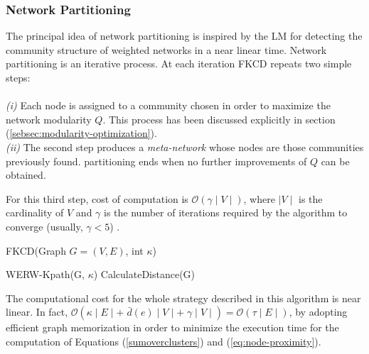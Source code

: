 {\subsubsection*{Network Partitioning}\label{subsec:network-partitioning}
The principal idea of network partitioning is inspired by the LM \cite{ref-27} for detecting the community structure of weighted networks in a near linear time. Network partitioning is an iterative process. At each iteration FKCD repeats two simple steps:\\\\
\textit{(i)} Each node is assigned to a community chosen in order to maximize the network modularity $Q$. This process has been discussed explicitly in section (\ref{sebsec:modularity-optimization}).\\
\textit{(ii)} The second step produces a \textit{meta-network} whose nodes are those communities previously found.
partitioning ends when no further improvements of $Q$ can be obtained.

For this third step, cost of computation is $\mathcal{O} (\gamma \mid V \mid)$, where $\mid V \mid$ is the cardinality of $V$ and $\gamma$ is the number of iterations required by the algorithm to converge (usually, $\gamma < 5$) \cite{ref-28}.

\begin{algorithm}
	\caption{FKCD(Graph $G = (V, E)$, int $\kappa$)}
	\label{algo:fkcd-algorithm}
	\SetAlgoLined
	\DontPrintSemicolon
	WERW-Kpath(G, $\kappa$)
	CalculateDistance(G)
\end{algorithm}
The computational cost for the whole strategy described in this algorithm is near linear. In fact, $\mathcal{O} (\kappa \mid E \mid + \;\bar{d} (e) \mid V \mid + \;\gamma \mid V \mid) = \mathcal{O} (\tau \mid E \mid)$, by adopting efficient graph memorization in order to minimize the execution time for the computation of Equations (\ref{sumoverclusters}) and (\ref{eq:node-proximity}).

\vfill
\pagebreak


}
